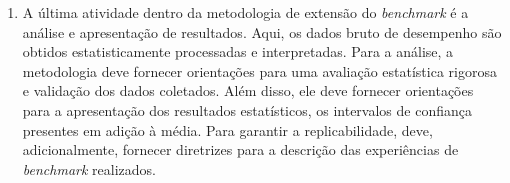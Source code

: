 \begin{enumerate}
	\item A última atividade dentro da metodologia de extensão do \textit{benchmark} é a análise e apresentação de resultados. Aqui, os dados bruto de desempenho são obtidos estatisticamente processadas e interpretadas. Para a análise, a metodologia deve fornecer orientações para uma avaliação estatística rigorosa e validação dos dados coletados. Além disso, ele deve fornecer orientações para a apresentação dos resultados estatísticos, os intervalos de confiança presentes em adição à média. Para garantir a replicabilidade, deve, adicionalmente, fornecer diretrizes para a descrição das experiências de \textit{benchmark} realizados.		
	
\end{enumerate}




